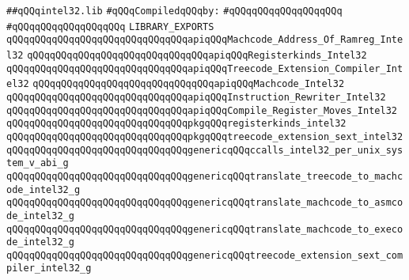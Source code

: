 \label{src/lib/compiler/back/low/intel32/backend-intel32.lib}
\verb|##qQQqintel32.lib|\newline
\newline
\verb|#qQQqCompiledqQQqby:|\newline
\verb|#qQQqqQQqqQQqqQQqqQQq|\newline
\verb|#qQQqqQQqqQQqqQQqqQQq|\newline
\newline
\verb|LIBRARY_EXPORTS|\newline
\newline
\verb|qQQqqQQqqQQqqQQqqQQqqQQqqQQqqQQqapiqQQqMachcode_Address_Of_Ramreg_Intel32|\newline
\verb|qQQqqQQqqQQqqQQqqQQqqQQqqQQqqQQqapiqQQqRegisterkinds_Intel32|\newline
\verb|qQQqqQQqqQQqqQQqqQQqqQQqqQQqqQQqapiqQQqTreecode_Extension_Compiler_Intel32|\newline
\verb|qQQqqQQqqQQqqQQqqQQqqQQqqQQqqQQqapiqQQqMachcode_Intel32|\newline
\verb|qQQqqQQqqQQqqQQqqQQqqQQqqQQqqQQqapiqQQqInstruction_Rewriter_Intel32|\newline
\verb|qQQqqQQqqQQqqQQqqQQqqQQqqQQqqQQqapiqQQqCompile_Register_Moves_Intel32|\newline
\newline
\verb|qQQqqQQqqQQqqQQqqQQqqQQqqQQqqQQqpkgqQQqregisterkinds_intel32|\newline
\verb|qQQqqQQqqQQqqQQqqQQqqQQqqQQqqQQqpkgqQQqtreecode_extension_sext_intel32|\newline
\newline
\verb|qQQqqQQqqQQqqQQqqQQqqQQqqQQqqQQqgenericqQQqccalls_intel32_per_unix_system_v_abi_g|\newline
\verb|qQQqqQQqqQQqqQQqqQQqqQQqqQQqqQQqgenericqQQqtranslate_treecode_to_machcode_intel32_g|\newline
\verb|qQQqqQQqqQQqqQQqqQQqqQQqqQQqqQQqgenericqQQqtranslate_machcode_to_asmcode_intel32_g|\newline
\verb|qQQqqQQqqQQqqQQqqQQqqQQqqQQqqQQqgenericqQQqtranslate_machcode_to_execode_intel32_g|\newline
\verb|qQQqqQQqqQQqqQQqqQQqqQQqqQQqqQQqgenericqQQqtreecode_extension_sext_compiler_intel32_g|\newline

